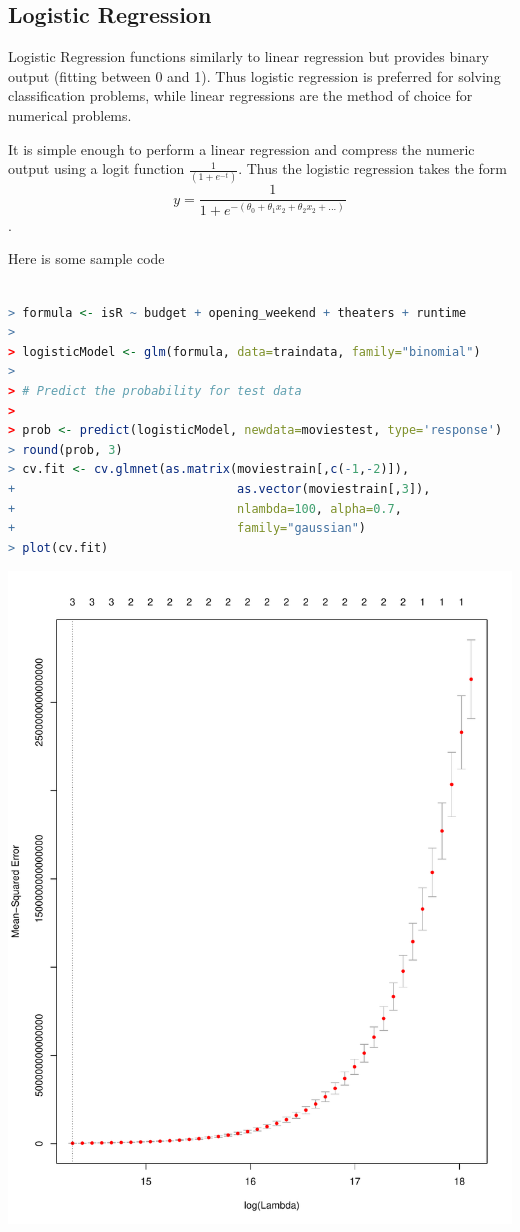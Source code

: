 \documentclass{article}
\begin{document}
\begin{spacing}{1.1}
\subsection{Logistic Regression}

Logistic Regression functions similarly to linear regression but provides binary output (fitting between 0 and 1).  Thus logistic regression is preferred for solving classification problems, while linear regressions are the method of choice for numerical problems.  

It is simple enough to perform a linear regression and compress the numeric output using a logit function $ \frac{1}{(1+e^{-t})} $.  Thus the logistic regression takes the form 
$$y = \frac{1}{1+e^{-(\theta_0+\theta_1x_2 + \theta_2x_2 + ...)}}$$.  

Here is some sample code

\vspace{3mm}

\begin{lstlisting}[language=R]

> formula <- isR ~ budget + opening_weekend + theaters + runtime
> 
> logisticModel <- glm(formula, data=traindata, family="binomial")
> 
> # Predict the probability for test data
> 
> prob <- predict(logisticModel, newdata=moviestest, type='response')
> round(prob, 3)
> cv.fit <- cv.glmnet(as.matrix(moviestrain[,c(-1,-2)]),
+                               as.vector(moviestrain[,3]),
+                               nlambda=100, alpha=0.7,
+                               family="gaussian")
> plot(cv.fit)
\end{lstlisting}

\includegraphics[scale=0.4]{logisticregression1.pdf}


\end{spacing}
\end{document}
